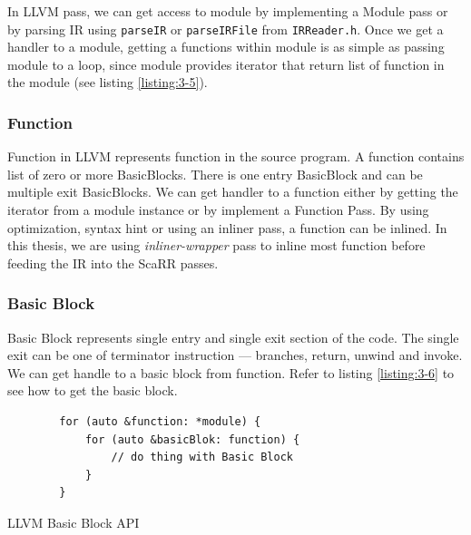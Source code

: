 In LLVM pass, we can get access to module by implementing a Module pass or by parsing IR using \texttt{parseIR} or \texttt{parseIRFile} from \texttt{IRReader.h}. Once we get a handler to a module, getting a functions within module is as simple as passing module to a loop, since module provides iterator that return list of function in the module (see listing \ref{listing:3-5}).


\subsubsection{Function}

Function in LLVM represents function in the source program. A function contains list of zero or more BasicBlocks. There is one entry BasicBlock and can be multiple exit BasicBlocks. We can get handler to a function either by getting the iterator from a module instance or by implement a Function Pass. By using optimization, syntax hint or using an inliner pass, a function can be inlined. In this thesis, we are using \emph{inliner-wrapper} pass to inline most function before feeding the IR into the ScaRR passes.

\subsubsection{Basic Block}

Basic Block represents single entry and single exit section of the code. The single exit can be one of terminator instruction — branches, return, unwind and invoke. We can get handle to a basic block from function. Refer to listing \ref{listing:3-6} to see how to get the basic block.

\begin{listing}
    \begin{verbatim}
        for (auto &function: *module) {
            for (auto &basicBlok: function) {
                // do thing with Basic Block
            }
        }
    \end{verbatim}
    \caption{LLVM Basic Block API}    
    \label{listing:3-6}
\end{listing}

